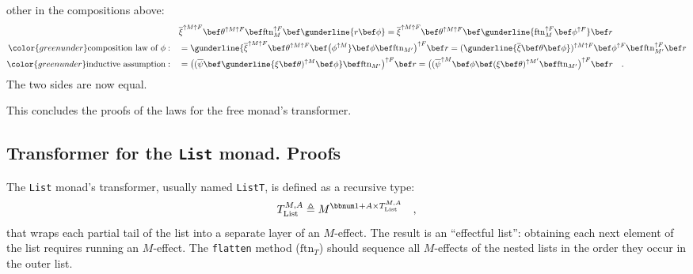 other in the compositions above:
\begin{align*}
 & \overline{\xi}^{\uparrow M\uparrow F}\bef\theta^{\uparrow M\uparrow F}\bef\text{ftn}_{M}^{\uparrow F}\bef\gunderline{r\bef\phi}=\overline{\xi}^{\uparrow M\uparrow F}\bef\theta^{\uparrow M\uparrow F}\bef\gunderline{\text{ftn}_{M}^{\uparrow F}\bef\phi^{\uparrow F}}\bef r\\
{\color{greenunder}\text{composition law of }\phi:}\quad & =\gunderline{\overline{\xi}^{\uparrow M\uparrow F}\bef\theta^{\uparrow M\uparrow F}\bef\big(\phi^{\uparrow M}}\bef\phi\bef\text{ftn}_{M^{\prime}}\big)^{\uparrow F}\bef r=(\gunderline{\overline{\xi}\bef\theta\bef\phi})^{\uparrow M\uparrow F}\bef\phi^{\uparrow F}\bef\text{ftn}_{M^{\prime}}^{\uparrow F}\bef r\\
{\color{greenunder}\text{inductive assumption}:}\quad & =\big((\overline{\psi}\bef\gunderline{\xi\bef\theta)^{\uparrow M}\bef\phi}\bef\text{ftn}_{M^{\prime}}\big)^{\uparrow F}\bef r=\big((\overline{\psi}^{\uparrow M}\bef\phi\bef(\xi\bef\theta)^{\uparrow M^{\prime}}\bef\text{ftn}_{M^{\prime}}\big)^{\uparrow F}\bef r\quad.
\end{align*}
The two sides are now equal.

This concludes the proofs of the laws for the free monad\textsf{'}s transformer.

\subsection{Transformer for the \texttt{List} monad. Proofs\label{subsec:Transformer-for-the-List-monad}}

The \lstinline!List! monad\textsf{'}s transformer, usually named \lstinline!ListT!,
is defined as a recursive type:
\[
T_{\text{List}}^{M,A}\triangleq M^{\bbnum 1+A\times T_{\text{List}}^{M,A}}\quad,
\]
that wraps each partial tail of the list into a separate layer of
an $M$-effect. The result is an \textsf{``}effectful list\textsf{''}: obtaining each
next element of the list requires running an $M$-effect. The \lstinline!flatten!
method ($\text{ftn}_{T}$) should sequence all $M$-effects of the
nested lists in the order they occur in the outer list.

